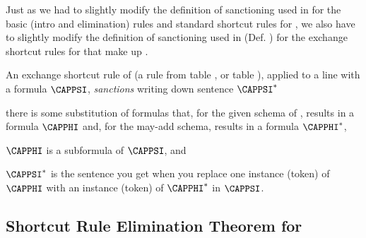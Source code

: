 Just as we had to slightly modify the definition of sanctioning used in \GSD{} for the basic (intro and elimination) rules and standard shortcut rules for \GQD{}, we also have to slightly modify the definition of sanctioning used in \GSDP{} (Def. ) for the exchange shortcut rules for \GQD{} that make up \GQDP{}.
\begin{majorILnc}{}
An exchange shortcut rule  of \GQDP{} (a rule from table , or table ), applied to a line with a \GQL{} formula $\CAPPSI$, \emph{sanctions} writing down sentence $\CAPPSI^*$ \Iff
\begin{cenumerate}
\item there is some substitution of \GQL{} formulas that, for the given schema of , results in a formula $\CAPPHI$ and, for the may-add schema, results in a formula $\CAPPHI^*$,
\item $\CAPPHI$ is a subformula of $\CAPPSI$, and
\item $\CAPPSI^*$ is the \GSL{} sentence you get when you replace one instance (token) of $\CAPPHI$ with an instance (token) of $\CAPPHI^*$ in $\CAPPSI$. 
\end{cenumerate}
\end{majorILnc}

\subsection{Shortcut Rule Elimination Theorem for \GQD{}}\label{Shortcut Rule Elimination Theorem Section}


